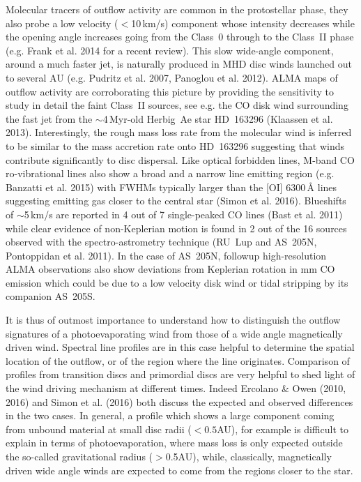 \documentclass[10pt,fleqn,twoside]{article}
\begin{document}
Molecular tracers of outflow activity are common in the protostellar
phase, they also probe a low velocity ($<$10\,km/s) component whose
intensity decreases while the opening angle increases going from the
Class~0 through to the Class~II phase (e.g. Frank et al. 2014 for a
recent review). This slow wide-angle component, around a much faster
jet, is naturally produced in MHD disc winds launched out to several
AU (e.g. Pudritz et al. 2007, Panoglou et al. 2012). ALMA maps of
outflow activity are corroborating this picture by providing the
sensitivity to study in detail the faint Class~II sources, see
e.g. the CO disk wind surrounding the fast jet from the
$\sim$4\,Myr-old Herbig~Ae star HD~163296 (Klaassen et
al. 2013). Interestingly, the rough mass loss rate from the molecular
wind is inferred to be similar to the mass accretion rate onto
HD~163296 suggesting that winds contribute significantly to disc
dispersal. Like optical forbidden lines, M-band CO ro-vibrational
lines also show a broad and a narrow line emitting region
(e.g. Banzatti et al. 2015) with FWHMs typically larger than the [OI]
6300\,\AA{} lines suggesting emitting gas closer to the central star
(Simon et al. 2016). Blueshifts of $\sim$5\,km/s are reported in 4 out
of  7 single-peaked CO lines (Bast et al. 2011) while clear evidence
of non-Keplerian motion is found in 2 out of the 16 sources observed
with the spectro-astrometry technique (RU~Lup and AS~205N, Pontoppidan
et al. 2011). In the case of AS~205N, followup high-resolution ALMA
observations also show deviations from Keplerian rotation in mm CO
emission which could be due to a low velocity disk wind or tidal
stripping by its companion AS~205S. 

It is thus of outmost importance to understand how to distinguish the
outflow signatures of a photoevaporating wind from those of a wide
angle magnetically driven wind. Spectral line profiles are in this
case helpful to determine the spatial location of the outflow, or of
the region where the line originates. Comparison of profiles from
transition discs and primordial discs are very helpful to shed light
of the wind driving mechanism at different times. Indeed Ercolano \&
Owen (2010, 2016) and Simon et al. (2016) both discuss the expected
and observed differences in the two cases. In general, a profile which
shows a large component coming from unbound material at small disc
radii ($<0.5$AU), for example is difficult to explain in terms of
photoevaporation, where mass loss is only expected outside the
so-called gravitational radius ($>$0.5AU), while, classically,
magnetically driven wide angle winds are expected to come from the
regions closer to the star. 
\end{document}
